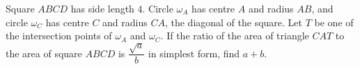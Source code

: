 Square $ABCD$ has side length $4$. Circle $\omega_A$ has centre $A$ and radius $AB$, and circle $\omega_C$ has centre $C$ and radius $CA$, the diagonal of the square. Let $T$ be one of the intersection points of $\omega_A$ and $\omega_C$. If the ratio of the area of triangle $CAT$ to the area of square $ABCD$ is $\dfrac{\sqrt a}{b}$ in simplest form, find $a+b$.
